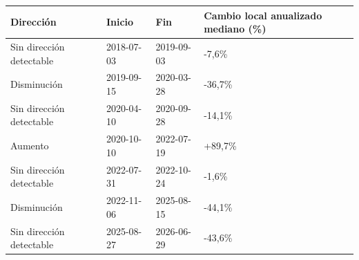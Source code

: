 \begin{tabular}{llll}
\toprule
Dirección & Inicio & Fin & Cambio local anualizado mediano (\%) \\
\midrule
Sin dirección detectable & 2018-07-03 & 2019-09-03 & -7,6\% \\
Disminución & 2019-09-15 & 2020-03-28 & -36,7\% \\
Sin dirección detectable & 2020-04-10 & 2020-09-28 & -14,1\% \\
Aumento & 2020-10-10 & 2022-07-19 & +89,7\% \\
Sin dirección detectable & 2022-07-31 & 2022-10-24 & -1,6\% \\
Disminución & 2022-11-06 & 2025-08-15 & -44,1\% \\
Sin dirección detectable & 2025-08-27 & 2026-06-29 & -43,6\% \\
\bottomrule
\end{tabular}
